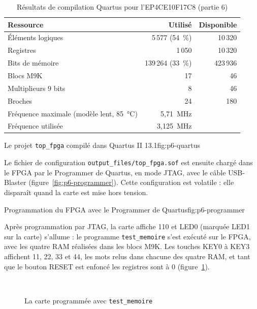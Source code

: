 \begin{table}[H]
\centering
\begin{tabular}{lrr}
\toprule
Ressource & Utilisé & Disponible \\
\midrule
Éléments logiques & 5\,577 (54~\%) & 10\,320 \\
Registres & 1\,050 & 10\,320 \\
Bits de mémoire & 139\,264 (33~\%) & 423\,936 \\
Blocs M9K & 17 & 46 \\
Multiplieurs 9 bits & 8 & 46 \\
Broches & 24 & 180 \\
\midrule
Fréquence maximale (modèle lent, 85~°C) & 5,71~MHz & \\
Fréquence utilisée & 3,125~MHz & \\
\bottomrule
\end{tabular}
\caption{Résultats de compilation Quartus pour l'EP4CE10F17C8 (partie 6)}
\label{tab:quartus-p6}
\end{table}

{Le projet \texttt{top\_fpga} compilé dans Quartus II 13.1}{fig:p6-quartus}

Le fichier de configuration \texttt{output\_files/top\_fpga.sof} est ensuite chargé dans le
FPGA par le Programmer de Quartus, en mode JTAG, avec le câble USB-Blaster
(figure~\ref{fig:p6-programmer}). Cette configuration est volatile : elle disparaît quand la
carte est mise hors tension.

{Programmation du FPGA avec le Programmer de Quartus}{fig:p6-programmer}

Après programmation par JTAG, la carte affiche 110 et LED0 (marquée LED1 sur la carte)
s'allume : le programme \texttt{test\_memoire} s'est exécuté sur le FPGA, avec les quatre
RAM réalisées dans les blocs M9K. Les touches KEY0 à KEY3 affichent 11, 22, 33 et 44, les
mots relus dans chacune des quatre RAM, et tant que le bouton RESET est enfoncé les registres
sont à 0 (figure~\ref{fig:p6-carte}).

\begin{figure}[H]
\centering
{}\hfill
{}\hfill
{}\\[3mm]
\hfill
{}\hfill
{}
\caption{La carte programmée avec \texttt{test\_memoire}}
\label{fig:p6-carte}
\end{figure}
